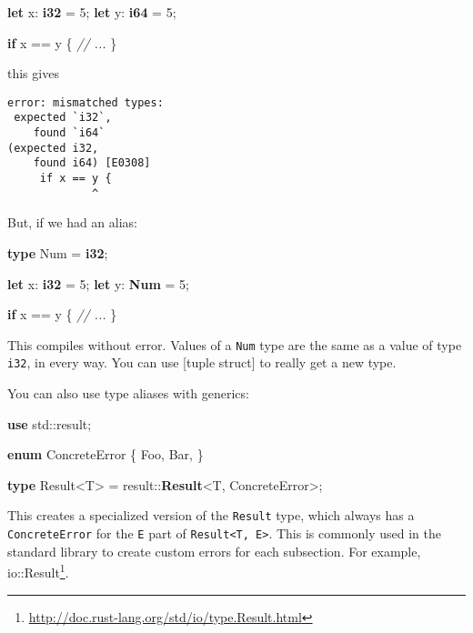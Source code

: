 \documentclass[a4paper,]{book}
\newenvironment{Shaded}{\begin{snugshade}}{\end{snugshade}}
\newcommand{\KeywordTok}[1]{\textcolor[rgb]{0.13,0.29,0.53}{\textbf{{#1}}}}
\newcommand{\DecValTok}[1]{\textcolor[rgb]{0.00,0.00,0.81}{{#1}}}
\newcommand{\CommentTok}[1]{\textcolor[rgb]{0.56,0.35,0.01}{\textit{{#1}}}}
\newcommand{\NormalTok}[1]{{#1}}
\renewcommand{\href}[2]{#2\footnote{\url{#1}}}
\begin{document}
\begin{Shaded}
\begin{Highlighting}[]
\KeywordTok{let} \NormalTok{x: }\KeywordTok{i32} \NormalTok{= }\DecValTok{5}\NormalTok{;}
\KeywordTok{let} \NormalTok{y: }\KeywordTok{i64} \NormalTok{= }\DecValTok{5}\NormalTok{;}

\KeywordTok{if} \NormalTok{x == y \{}
   \CommentTok{// ...}
\NormalTok{\}}
\end{Highlighting}
\end{Shaded}

this gives

\begin{verbatim}
error: mismatched types:
 expected `i32`,
    found `i64`
(expected i32,
    found i64) [E0308]
     if x == y {
             ^
\end{verbatim}

But, if we had an alias:

\begin{Shaded}
\begin{Highlighting}[]
\KeywordTok{type} \NormalTok{Num = }\KeywordTok{i32}\NormalTok{;}

\KeywordTok{let} \NormalTok{x: }\KeywordTok{i32} \NormalTok{= }\DecValTok{5}\NormalTok{;}
\KeywordTok{let} \NormalTok{y: }\KeywordTok{Num} \NormalTok{= }\DecValTok{5}\NormalTok{;}

\KeywordTok{if} \NormalTok{x == y \{}
   \CommentTok{// ...}
\NormalTok{\}}
\end{Highlighting}
\end{Shaded}

This compiles without error. Values of a \texttt{Num} type are the same
as a value of type \texttt{i32}, in every way. You can use {[}tuple
struct{]} to really get a new type.

You can also use type aliases with generics:

\begin{Shaded}
\begin{Highlighting}[]
\KeywordTok{use} \NormalTok{std::result;}

\KeywordTok{enum} \NormalTok{ConcreteError \{}
    \NormalTok{Foo,}
    \NormalTok{Bar,}
\NormalTok{\}}

\KeywordTok{type} \NormalTok{Result<T> = result::}\KeywordTok{Result}\NormalTok{<T, ConcreteError>;}
\end{Highlighting}
\end{Shaded}

This creates a specialized version of the \texttt{Result} type, which
always has a \texttt{ConcreteError} for the \texttt{E} part of
\texttt{Result\textless{}T,\ E\textgreater{}}. This is commonly used in
the standard library to create custom errors for each subsection. For
example,
\href{http://doc.rust-lang.org/std/io/type.Result.html}{io::Result}.
\end{document}
